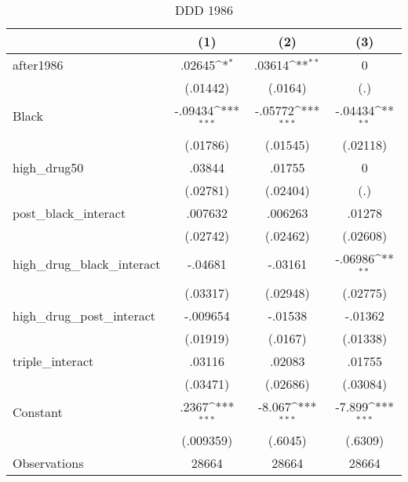 \begin{table}[htbp]\centering
\def\sym#1{\ifmmode^{#1}\else\(^{#1}\)\fi}
\caption{DDD 1986}
\begin{tabular}{l*{3}{c}}
\hline\hline
                    &\multicolumn{1}{c}{(1)}         &\multicolumn{1}{c}{(2)}         &\multicolumn{1}{c}{(3)}         \\
\hline
after1986           &      .02645\sym{*}  &      .03614\sym{**} &           0         \\
                    &    (.01442)         &     (.0164)         &         (.)         \\
[1em]
Black               &     -.09434\sym{***}&     -.05772\sym{***}&     -.04434\sym{**} \\
                    &    (.01786)         &    (.01545)         &    (.02118)         \\
[1em]
high\_drug50         &      .03844         &      .01755         &           0         \\
                    &    (.02781)         &    (.02404)         &         (.)         \\
[1em]
post\_black\_interact &     .007632         &     .006263         &      .01278         \\
                    &    (.02742)         &    (.02462)         &    (.02608)         \\
[1em]
high\_drug\_black\_interact&     -.04681         &     -.03161         &     -.06986\sym{**} \\
                    &    (.03317)         &    (.02948)         &    (.02775)         \\
[1em]
high\_drug\_post\_interact&    -.009654         &     -.01538         &     -.01362         \\
                    &    (.01919)         &     (.0167)         &    (.01338)         \\
[1em]
triple\_interact     &      .03116         &      .02083         &      .01755         \\
                    &    (.03471)         &    (.02686)         &    (.03084)         \\
[1em]
Constant            &       .2367\sym{***}&      -8.067\sym{***}&      -7.899\sym{***}\\
                    &   (.009359)         &     (.6045)         &     (.6309)         \\
\hline
Observations        &       28664         &       28664         &       28664         \\

\end{tabular}
\end{table}
